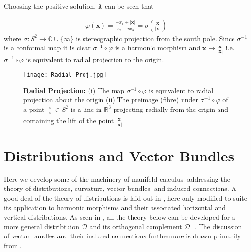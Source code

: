 \documentclass[12pt]{article}
\theoremstyle{definition}
\numberwithin{equation}{subsection}
\begin{document}
Choosing the positive solution, it can be seen that

\begin{align}\label{eq:24}
     \varphi(\boldsymbol{x}) = \frac{-x_1 + |\boldsymbol{x}|}{x_2 - ix_3} = \sigma \left(\frac{\boldsymbol{x}}{| \boldsymbol{x}|} \right)
\end{align}
where $\sigma: S^2 \rightarrow \mathbb{C} \cup \{ \infty \}$ is stereographic projection from the south pole. Since $\sigma^{-1}$ is a conformal map it is clear $\sigma^{-1} \circ \varphi$ is a harmonic morphism and $\boldsymbol{x} \mapsto \frac{\boldsymbol{x}}{| \boldsymbol{x}|}$ i.e. $\sigma^{-1} \circ \varphi$ is equivalent to radial projection to the origin.

    \begin{figure}[H]
    \centering
    \texttt{[image: Radial\_Proj.jpg]}
    \caption[Radial Projection]{ \textbf{Radial Projection:}  \small (i) The map $\sigma^{-1}\circ \varphi$ is equivalent to radial projection about the origin (ii) The preimage (fibre) under $\sigma^{-1}\circ\varphi$ of a point $\frac{\boldsymbol{x}}{| \boldsymbol{x}|} \in S^2$ is a line in $\mathbb{R}^3$ projecting radially from the origin and containing the lift of the point $\frac{\boldsymbol{x}}{| \boldsymbol{x}|}$ }
    \label{fig:Orthog}
\end{figure}

\section{Distributions and Vector Bundles}

Here we develop some of the machinery of manifold calculus, addressing the theory of distributions, curvature, vector bundles, and induced connections. A good deal of the theory of distributions is laid out in \cite{SubRiem}, here only modified to suite its application to harmonic morphisms and their associated horizontal and vertical distributions. As seen in \cite{SubRiem}, all the theory below can be developed for a more general distribtuion $\mathcal{D}$ and its orthogonal complement $\mathcal{D}^\perp$. The discussion of vector bundles and their induced connections furthermore is drawn primarily from \cite{BairdWood}. 
\end{document}
